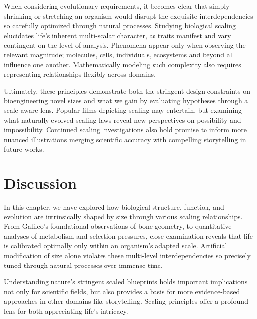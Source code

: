 When considering evolutionary requirements, it becomes clear that simply shrinking or stretching an organism would disrupt the exquisite interdependencies so carefully optimized through natural processes. Studying biological scaling elucidates life's inherent multi-scalar character, as traits manifest and vary contingent on the level of analysis. Phenomena appear only when observing the relevant magnitude; molecules, cells, individuals, ecosystems and beyond all influence one another. Mathematically modeling such complexity also requires representing relationships flexibly across domains.

Ultimately, these principles demonstrate both the stringent design constraints on bioengineering novel sizes and what we gain by evaluating hypotheses through a scale-aware lens. Popular films depicting scaling may entertain, but examining what naturally evolved scaling laws reveal new perspectives on possibility and impossibility. Continued scaling investigations also hold promise to inform more nuanced illustrations merging scientific accuracy with compelling storytelling in future works.

\section{Discussion}

In this chapter, we have explored how biological structure, function, and evolution are intrinsically shaped by size through various scaling relationships. From Galileo's foundational observations of bone geometry, to quantitative analyses of metabolism and selection pressures, close examination reveals that life is calibrated optimally only within an organism's adapted scale. Artificial modification of size alone violates these multi-level interdependencies so precisely tuned through natural processes over immense time.

Understanding nature's stringent scaled blueprints holds important implications not only for scientific fields, but also provides a basis for more evidence-based approaches in other domains like storytelling. Scaling principles offer a profound lens for both appreciating life's intricacy.